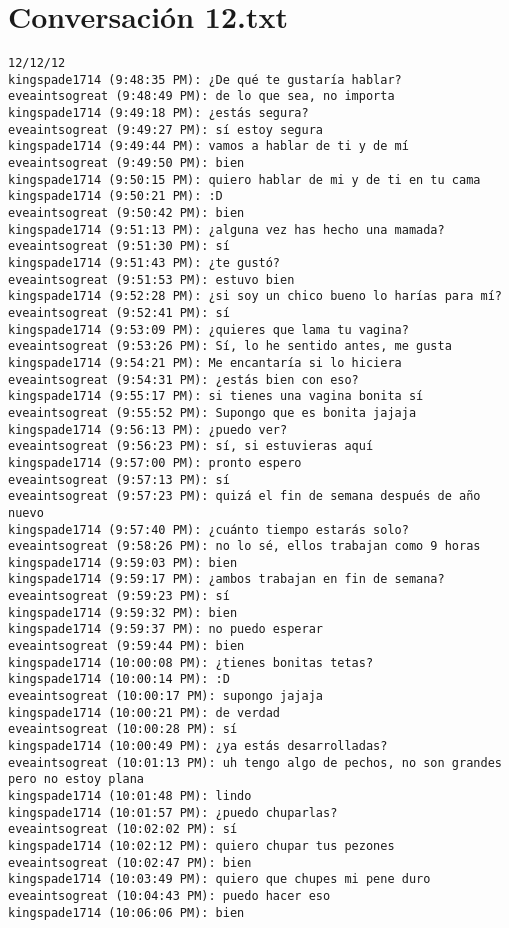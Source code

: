 \section{Conversaci\'on 12.txt}

\begin{verbatim}
12/12/12
kingspade1714 (9:48:35 PM): ¿De qué te gustaría hablar?
eveaintsogreat (9:48:49 PM): de lo que sea, no importa
kingspade1714 (9:49:18 PM): ¿estás segura?
eveaintsogreat (9:49:27 PM): sí estoy segura
kingspade1714 (9:49:44 PM): vamos a hablar de ti y de mí
eveaintsogreat (9:49:50 PM): bien
kingspade1714 (9:50:15 PM): quiero hablar de mi y de ti en tu cama
kingspade1714 (9:50:21 PM): :D
eveaintsogreat (9:50:42 PM): bien
kingspade1714 (9:51:13 PM): ¿alguna vez has hecho una mamada?
eveaintsogreat (9:51:30 PM): sí
kingspade1714 (9:51:43 PM): ¿te gustó?
eveaintsogreat (9:51:53 PM): estuvo bien
kingspade1714 (9:52:28 PM): ¿si soy un chico bueno lo harías para mí?
eveaintsogreat (9:52:41 PM): sí
kingspade1714 (9:53:09 PM): ¿quieres que lama tu vagina?
eveaintsogreat (9:53:26 PM): Sí, lo he sentido antes, me gusta
kingspade1714 (9:54:21 PM): Me encantaría si lo hiciera
eveaintsogreat (9:54:31 PM): ¿estás bien con eso?
kingspade1714 (9:55:17 PM): si tienes una vagina bonita sí
eveaintsogreat (9:55:52 PM): Supongo que es bonita jajaja
kingspade1714 (9:56:13 PM): ¿puedo ver?
eveaintsogreat (9:56:23 PM): sí, si estuvieras aquí
kingspade1714 (9:57:00 PM): pronto espero
eveaintsogreat (9:57:13 PM): sí
eveaintsogreat (9:57:23 PM): quizá el fin de semana después de año nuevo
kingspade1714 (9:57:40 PM): ¿cuánto tiempo estarás solo?
eveaintsogreat (9:58:26 PM): no lo sé, ellos trabajan como 9 horas
kingspade1714 (9:59:03 PM): bien
kingspade1714 (9:59:17 PM): ¿ambos trabajan en fin de semana?
eveaintsogreat (9:59:23 PM): sí
kingspade1714 (9:59:32 PM): bien
kingspade1714 (9:59:37 PM): no puedo esperar
eveaintsogreat (9:59:44 PM): bien
kingspade1714 (10:00:08 PM): ¿tienes bonitas tetas?
kingspade1714 (10:00:14 PM): :D
eveaintsogreat (10:00:17 PM): supongo jajaja
kingspade1714 (10:00:21 PM): de verdad
eveaintsogreat (10:00:28 PM): sí
kingspade1714 (10:00:49 PM): ¿ya estás desarrolladas?
eveaintsogreat (10:01:13 PM): uh tengo algo de pechos, no son grandes pero no estoy plana
kingspade1714 (10:01:48 PM): lindo
kingspade1714 (10:01:57 PM): ¿puedo chuparlas?
eveaintsogreat (10:02:02 PM): sí
kingspade1714 (10:02:12 PM): quiero chupar tus pezones
eveaintsogreat (10:02:47 PM): bien
kingspade1714 (10:03:49 PM): quiero que chupes mi pene duro
eveaintsogreat (10:04:43 PM): puedo hacer eso
kingspade1714 (10:06:06 PM): bien

\end{verbatim}
